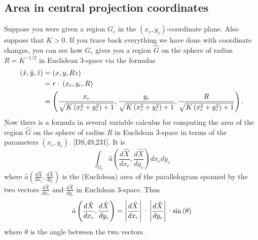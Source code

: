 \documentclass{article}%
\begin{document}
\subsection{Area in central projection coordinates}

Suppose you were given a region $G_{c}$ in the $\left(  x_{c},y_{c}\right)
$-coordinate plane. Also suppose that $K>0$. If you trace back everything we
have done with coordinate changes, you can see how $G_{c}$ gives you a region
$\hat{G}$ on the sphere of radius $R=K^{-1/2}$ in Euclidean $3$-space via the
formulas%
\begin{align*}
\left(  \hat{x},\hat{y},\hat{z}\right)   &  =\left(  x,y,Rz\right) \\
&  =r\text{\textperiodcentered}\left(  x_{c},y_{c},R\right) \\
&  =\left(  \frac{x_{c}}{\sqrt{K\left(  x_{c}^{2}+y_{c}^{2}\right)  +1}}%
,\frac{y_{c}}{\sqrt{K\left(  x_{c}^{2}+y_{c}^{2}\right)  +1}},\frac{R}%
{\sqrt{K\left(  x_{c}^{2}+y_{c}^{2}\right)  +1}}\right)  .
\end{align*}
Now there is a formula in several variable calculus for computing the area of
the region $\hat{G}$ on the sphere of radius $R$ in Euclidean $3$-space in
terms of the parameters $\left(  x_{c},y_{c}\right)  $. [DS,49,231]. It is
\begin{equation}%
{\displaystyle\int\nolimits_{G_{c}}}
\hat{a}\left(  \frac{d\hat{X}}{dx_{c}},\frac{d\hat{X}}{dy_{c}}\right)
dx_{c}dy_{c} \label{68}%
\end{equation}
where $\hat{a}\left(  \frac{d\hat{X}}{dx_{c}},\frac{d\hat{X}}{dy_{c}}\right)
$ is the (Euclidean) area of the parallelogram spanned by the two vectors
$\frac{d\hat{X}}{dx_{c}}$ and $\frac{d\hat{X}}{dy_{c}}$ in Euclidean
$3$-space. Thus%
\[
\hat{a}\left(  \frac{d\hat{X}}{dx_{c}},\frac{d\hat{X}}{dy_{c}}\right)
=\left\vert \frac{d\hat{X}}{dx_{c}}\right\vert \text{\textperiodcentered
}\left\vert \frac{d\hat{X}}{dy_{c}}\right\vert \text{\textperiodcentered
}\mathrm{sin}\left(  \theta\right)
\]
where $\theta$ is the angle between the two vectors.
\end{document}

